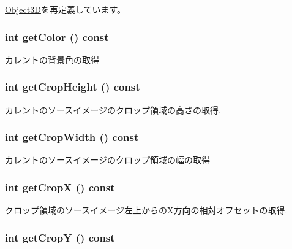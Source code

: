 \hyperlink{classm3g_1_1Object3D_8aad1ceab4c2a03609c8a42324ce484d}{Object3D}を再定義しています。\hypertarget{classm3g_1_1Background_4cfa1931c265ec3412fe3f6408a1b4f5}{
\subsubsection[{getColor}]{\setlength{\rightskip}{0pt plus 5cm}int getColor () const}}
\label{classm3g_1_1Background_4cfa1931c265ec3412fe3f6408a1b4f5}


カレントの背景色の取得 \hypertarget{classm3g_1_1Background_d6d9d6f23b7bb004c93642bcd081f4a3}{
\subsubsection[{getCropHeight}]{\setlength{\rightskip}{0pt plus 5cm}int getCropHeight () const}}
\label{classm3g_1_1Background_d6d9d6f23b7bb004c93642bcd081f4a3}


カレントのソースイメージのクロップ領域の高さの取得. \hypertarget{classm3g_1_1Background_5c6515f6706675ef31ca5dfa0a03b953}{
\subsubsection[{getCropWidth}]{\setlength{\rightskip}{0pt plus 5cm}int getCropWidth () const}}
\label{classm3g_1_1Background_5c6515f6706675ef31ca5dfa0a03b953}


カレントのソースイメージのクロップ領域の幅の取得 \hypertarget{classm3g_1_1Background_d0ba0211183decc8f0459ca598b12912}{
\subsubsection[{getCropX}]{\setlength{\rightskip}{0pt plus 5cm}int getCropX () const}}
\label{classm3g_1_1Background_d0ba0211183decc8f0459ca598b12912}


クロップ領域のソースイメージ左上からのX方向の相対オフセットの取得. \hypertarget{classm3g_1_1Background_9ef03b219415a1f08aef6745ad5d87d0}{
\subsubsection[{getCropY}]{\setlength{\rightskip}{0pt plus 5cm}int getCropY () const}}
\label{classm3g_1_1Background_9ef03b219415a1f08aef6745ad5d87d0}


